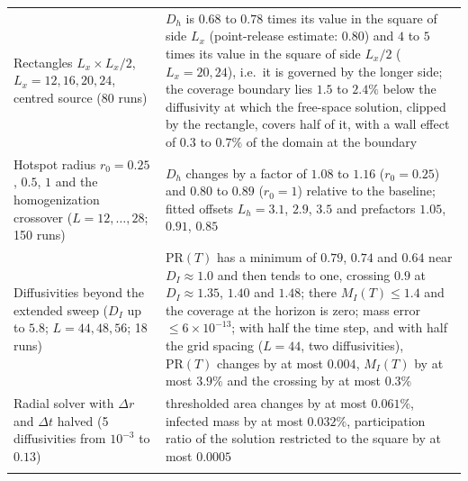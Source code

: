 \begin{tabular}{p{6.2cm}p{9.2cm}}
\addlinespace
Rectangles $L_x \times L_x/2$, $L_x = 12, 16, 20, 24$, centred source (80 runs) & $D_h$ is $0.68$ to $0.78$ times its value in the square of side $L_x$ (point-release estimate: $0.80$) and $4$ to $5$ times its value in the square of side $L_x/2$ ($L_x = 20, 24$), i.e.\ it is governed by the longer side; the coverage boundary lies $1.5$ to $2.4\%$ below the diffusivity at which the free-space solution, clipped by the rectangle, covers half of it, with a wall effect of $0.3$ to $0.7\%$ of the domain at the boundary \\
\addlinespace
Hotspot radius $r_0 = 0.25$, $0.5$, $1$ and the homogenization crossover ($L = 12, \dots, 28$; 150 runs) & $D_h$ changes by a factor of $1.08$ to $1.16$ ($r_0 = 0.25$) and $0.80$ to $0.89$ ($r_0 = 1$) relative to the baseline; fitted offsets $L_h = 3.1$, $2.9$, $3.5$ and prefactors $1.05$, $0.91$, $0.85$ \\
\addlinespace
Diffusivities beyond the extended sweep ($D_I$ up to $5.8$; $L = 44, 48, 56$; 18 runs) & $\mathrm{PR}(T)$ has a minimum of $0.79$, $0.74$ and $0.64$ near $D_I \approx 1.0$ and then tends to one, crossing $0.9$ at $D_I \approx 1.35$, $1.40$ and $1.48$; there $M_I(T) \le 1.4$ and the coverage at the horizon is zero; mass error $\le 6\times 10^{-13}$; with half the time step, and with half the grid spacing ($L = 44$, two diffusivities), $\mathrm{PR}(T)$ changes by at most $0.004$, $M_I(T)$ by at most $3.9\%$ and the crossing by at most $0.3\%$ \\
\addlinespace
Radial solver with $\Delta r$ and $\Delta t$ halved (5 diffusivities from $10^{-3}$ to $0.13$) & thresholded area changes by at most $0.061\%$, infected mass by at most $0.032\%$, participation ratio of the solution restricted to the square by at most $0.0005$ \\
\addlinespace
\bottomrule
\end{tabular}

